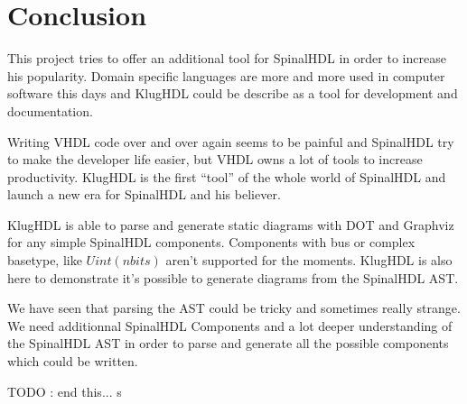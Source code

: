 \chapter{Conclusion}
\label{cha:Conclusion}

This project tries to offer an additional tool for SpinalHDL in order to
increase his popularity. Domain specific languages are more and more used in
computer software this days and KlugHDL could be describe as a tool for
development and documentation.

Writing VHDL code over and over again seems to be painful and SpinalHDL try to
make the developer life easier, but VHDL owns a lot of tools to increase
productivity. KlugHDL is the first ``tool'' of the whole world of SpinalHDL and
launch a new era for SpinalHDL and his believer.

KlugHDL is able to parse and generate static diagrams with DOT and Graphviz for
any simple SpinalHDL components. Components with bus or complex basetype, like
$Uint(n bits)$ aren't supported for the moments. KlugHDL is also here to
demonstrate it's possible to generate diagrams from the SpinalHDL AST.

We have seen that parsing the AST could be tricky and sometimes really strange.
We need additionnal SpinalHDL Components and a lot deeper understanding of the
SpinalHDL AST in order to parse and generate all the possible components which
could be written.

TODO : end this...
s
